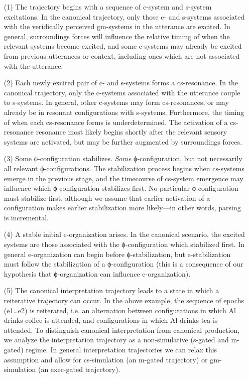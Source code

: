 \begin{enumerate}
\item[(1)]
The trajectory begins with a sequence of c-system and s-system excitations. In the canonical trajectory, only those c- and s-systems associated with the veridically perceived gm-systems in the utterance are excited. In general, surroundings forces will influence the relative timing of when the relevant systems become excited, and some c-systems may already be excited from previous utterances or context, including ones which are not associated with the utterance. 
\item[(2)]
Each newly excited pair of c- and s-systems forms a cs-resonance. In the canonical trajectory, only the c-systems associated with the utterance couple to s-systems. In general, other c-systems may form cs-resonances, or may already be in resonant configurations with s-systems. Furthermore, the timing of when each cs-resonance forms is underdetermined. The activation of a cs-resonance resonance most likely begins shortly after the relevant sensory systems are activated, but may be further augmented by surroundings forces.
\item[(3)]
Some ϕ-configuration stabilizes. \textit{Some} ϕ-configuration, but not necessarily all relevant ϕ-configurations. The stabilization process begins when cs-systems emerge in the previous stage, and the timecourse of cs-system emergence may influence which ϕ-configuration stabilizes first. No particular ϕ-configuration must stabilize first, although we assume that earlier activation of a configuration makes earlier stabilization more likely—in other words, parsing is incremental. 
\item[(4)]
A stable initial e-organization arises. In the canonical scenario, the excited systems are those associated with the ϕ-configuration which stabilized first. In general e-organization can begin before ϕ-stabilization, but e-stabilization must follow the stabilization of a ϕ-configuration (this is a consequence of our hypothesis that ϕ-organization can influence e-organization). 
\item[(5)]
The canonical interpretation trajectory leads to a state in which a reiterative trajectory can occur. In the above example, the sequence of epochs (e1…e2) is reiterated, i.e. an alternation between configurations in which {\textbar}Al drinks coffee{\textbar} is attended, and configurations in which {\textbar}Al drinks tea{\textbar} is attended. To distinguish canonical interpretation from canonical production, we analyze the interpretation trajectory as a non-simulative (s-gated and m-gated) regime. In general interpretation trajectories we can relax this assumption and allow for cs-simulation (an m-gated trajectory) or gm-simulation (an exec-gated trajectory).
\end{enumerate}

